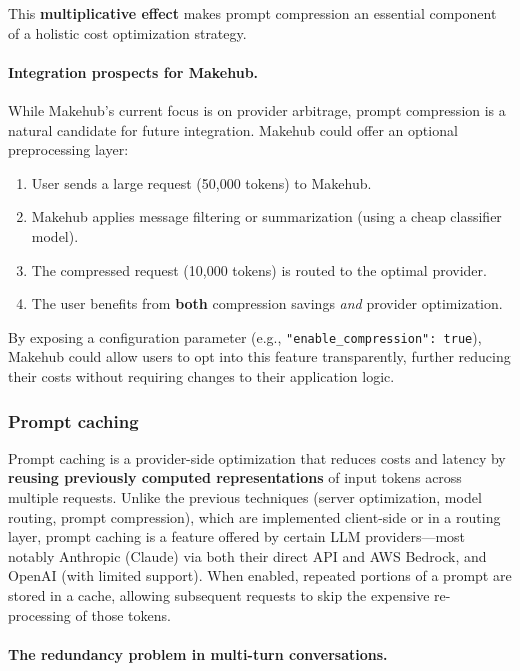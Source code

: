 \documentclass[english]{article}
\begin{document}
This \textbf{multiplicative effect} makes prompt compression an essential component of a holistic cost optimization strategy.

\paragraph{Integration prospects for Makehub.}

While Makehub's current focus is on provider arbitrage, prompt compression is a natural candidate for future integration. Makehub could offer an optional preprocessing layer:
\begin{enumerate}
    \item User sends a large request (50,000 tokens) to Makehub.
    \item Makehub applies message filtering or summarization (using a cheap classifier model).
    \item The compressed request (10,000 tokens) is routed to the optimal provider.
    \item The user benefits from \textbf{both} compression savings \emph{and} provider optimization.
\end{enumerate}

By exposing a configuration parameter (e.g., \texttt{"enable\_compression": true}), Makehub could allow users to opt into this feature transparently, further reducing their costs without requiring changes to their application logic.


\subsubsection{Prompt caching}

Prompt caching is a provider-side optimization that reduces costs and latency by \textbf{reusing previously computed representations} of input tokens across multiple requests. Unlike the previous techniques (server optimization, model routing, prompt compression), which are implemented client-side or in a routing layer, prompt caching is a feature offered by certain LLM providers—most notably Anthropic (Claude) via both their direct API and AWS Bedrock, and OpenAI (with limited support). When enabled, repeated portions of a prompt are stored in a cache, allowing subsequent requests to skip the expensive re-processing of those tokens.

\paragraph{The redundancy problem in multi-turn conversations.}
\end{document}
